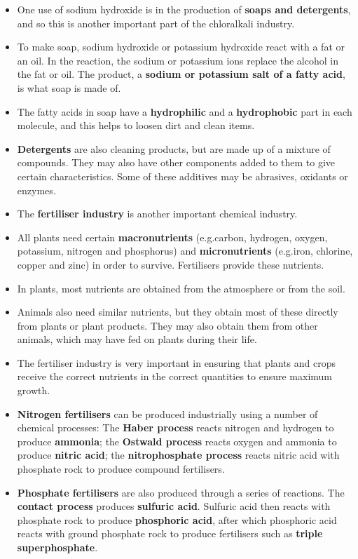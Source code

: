 \begin{itemize}
\item{One use of sodium hydroxide is in the production of \textbf{soaps and detergents}, and so this is another important part of the chloralkali industry.}
\item{To make soap, sodium hydroxide or potassium hydroxide react with a fat or an oil. In the reaction, the sodium or potassium ions replace the alcohol in the fat or oil. The product, a \textbf{sodium or potassium salt of a fatty acid}, is what soap is made of.}
\item{The fatty acids in soap have a \textbf{hydrophilic} and a \textbf{hydrophobic} part in each molecule, and this helps to loosen dirt and clean items.}
\item{\textbf{Detergents} are also cleaning products, but are made up of a mixture of compounds. They may also have other components added to them to give certain characteristics. Some of these additives may be abrasives, oxidants or enzymes.}
\item{The \textbf{fertiliser industry} is another important chemical industry.}
\item{All plants need certain \textbf{macronutrients} (e.g.\@ carbon, hydrogen, oxygen, potassium, nitrogen and phosphorus) and \textbf{micronutrients} (e.g.\@ iron, chlorine, copper and zinc) in order to survive. Fertilisers provide these nutrients.}
\item{In plants, most nutrients are obtained from the atmosphere or from the soil.}
\item{Animals also need similar nutrients, but they obtain most of these directly from plants or plant products. They may also obtain them from other animals, which may have fed on plants during their life.}
\item{The fertiliser industry is very important in ensuring that plants and crops receive the correct nutrients in the correct quantities to ensure maximum growth.} 
\item{\textbf{Nitrogen fertilisers} can be produced industrially using a number of chemical processes: The \textbf{Haber process} reacts nitrogen and hydrogen to produce \textbf{ammonia}; the \textbf{Ostwald process} reacts oxygen and ammonia to produce \textbf{nitric acid}; the \textbf{nitrophosphate process} reacts nitric acid with phosphate rock to produce compound fertilisers.}
\item{\textbf{Phosphate fertilisers} are also produced through a series of reactions. The \textbf{contact process} produces \textbf{sulfuric acid}. Sulfuric acid then reacts with phosphate rock to produce \textbf{phosphoric acid}, after which phosphoric acid reacts with ground phosphate rock to produce fertilisers such as \textbf{triple superphosphate}.}

\end{itemize}

